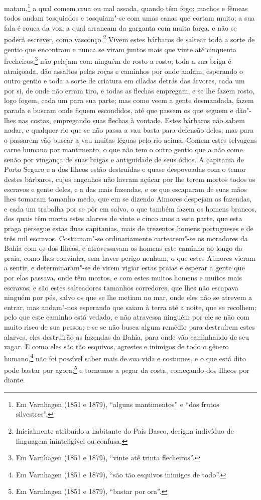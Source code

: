 \begin{linenumbers}
matam,\footnote{ Em Varnhagen (1851 e 1879), ``alguns mantimentos'' e ``dos frutos
silvestres''.} a qual comem crua ou mal assada, quando têm fogo; machos e fêmeas todos
andam tosquiados e tosquiam"-se com umas canas que cortam muito; a sua fala é rouca da voz,
a qual arrancam da garganta com muita força, e não se poderá escrever, como
vasconço.\footnote{ Inicialmente atribuído a habitante do País Basco, designa indivíduo de
linguagem ininteligível ou confusa.} Vivem estes bárbaros de saltear toda a sorte de
gentio que encontram e nunca se viram juntos mais que vinte até cinquenta
frecheiros;\footnote{ Em Varnhagen (1851 e 1879), ``vinte até trinta flecheiros''.} não
pelejam com ninguém de rosto a rosto; toda a sua briga é atraiçoada, dão assaltos pelas
roças e caminhos por onde andam, esperando o outro gentio e toda a sorte de criatura em
ciladas detrás das árvores, cada um por si, de onde não erram tiro, e todas as flechas
empregam, e se lhe fazem rosto, logo fogem, cada um para sua parte; mas como veem a gente
desmandada, fazem parada e buscam onde fiquem escondidos, até que passem os que seguem e
dão"-lhes nas costas, empregando suas flechas à vontade. Estes bárbaros não sabem nadar, e
qualquer rio que se não passa a vau basta para defensão deles; mas para o passarem vão
buscar a vau muitas léguas pelo rio acima. Comem estes selvagens carne humana por
mantimento, o que não tem o outro gentio que a não come senão por vingança de suas brigas
e antiguidade de seus ódios. A capitania de Porto Seguro e a dos Ilheos estão destruídas e
quase despovoadas com o temor destes bárbaros, cujos engenhos não lavram açúcar por lhe
terem mortos todos os escravos e gente deles, e a das mais fazendas, e os que escaparam de
suas mãos lhes tomaram tamanho medo, que em se dizendo Aimores despejam as fazendas, e
cada um trabalha por se pôr em salvo, o que também fazem os homens brancos, dos quais têm
morto estes alarves de vinte e cinco anos a esta parte, que esta praga persegue estas duas
capitanias, mais de trezentos homens portugueses e de três mil escravos. Costumam"-se
ordinariamente cartearem"-se os moradores da Bahia com os dos Ilheos, e atravessavam os
homens este caminho ao longo da praia, como lhes convinha, sem haver perigo nenhum, o que
estes Aimores vieram a sentir, e determinaram"-se de virem vigiar estas praias e esperar a
gente que por elas passava, onde têm mortos, e com estes muitos homens e muitos mais
escravos; e são estes salteadores tamanhos corredores, que lhes não escapava ninguém por
pés, salvo os que se lhe metiam no mar, onde eles não se atrevem a entrar, mas andam"-nos
esperando que saiam à terra até a noite, que se recolhem; pelo que este caminho está
vedado, e não atravessa ninguém por ele se não com muito risco de sua pessoa; e se se não
busca algum remédio para destruírem estes alarves, eles destruirão as fazendas da Bahia,
para onde vão caminhando de seu vagar. E como eles são tão esquivos, agrestes e inimigos
de todo o gênero humano,\footnote{ Em Varnhagen (1851 e 1879), ``são tão esquivos inimigos
de todo''.} não foi possível saber mais de sua vida e costumes, e o que está dito pode
bastar por agora;\footnote{ Em Varnhagen (1851 e 1879), ``bastar por ora''.} e tornemos a
pegar da costa, começando dos Ilheos por diante.


\end{linenumbers}
